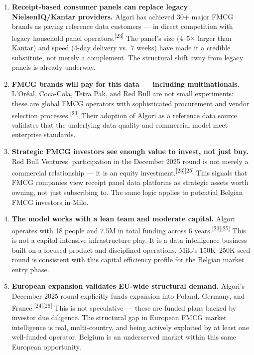 \documentclass[11pt,a4paper]{article}
\begin{document}
\begin{enumerate}[leftmargin=1.5em, itemsep=6pt]

  \item \textbf{Receipt-based consumer panels can replace legacy NielsenIQ/Kantar providers.}
  Algori has achieved 30+ major FMCG brands as paying reference data customers --- in direct competition with legacy household panel operators.\textsuperscript{[23]} The panel's size (4--5$\times$ larger than Kantar) and speed (4-day delivery vs.\ 7 weeks) have made it a credible substitute, not merely a complement. The structural shift away from legacy panels is already underway.

  \item \textbf{FMCG brands will pay for this data --- including multinationals.}
  L'Or\'{e}al, Coca-Cola, Tetra Pak, and Red Bull are not small experiments: these are global FMCG operators with sophisticated procurement and vendor selection processes.\textsuperscript{[23]} Their adoption of Algori as a reference data source validates that the underlying data quality and commercial model meet enterprise standards.

  \item \textbf{Strategic FMCG investors see enough value to invest, not just buy.}
  Red Bull Ventures' participation in the December 2025 round is not merely a commercial relationship --- it is an equity investment.\textsuperscript{[23][25]} This signals that FMCG companies view receipt panel data platforms as strategic assets worth owning, not just subscribing to. The same logic applies to potential Belgian FMCG investors in Milo.

  \item \textbf{The model works with a lean team and moderate capital.}
  Algori operates with 18 people and \texteuro{}7.5M in total funding across 6 years.\textsuperscript{[23][25]} This is not a capital-intensive infrastructure play. It is a data intelligence business built on a focused product and disciplined operations. Milo's \texteuro{}150K--250K seed round is consistent with this capital efficiency profile for the Belgian market entry phase.

  \item \textbf{European expansion validates EU-wide structural demand.}
  Algori's December 2025 round explicitly funds expansion into Poland, Germany, and France.\textsuperscript{[24][26]} This is not speculative --- these are funded plans backed by investor due diligence. The structural gap in European FMCG market intelligence is real, multi-country, and being actively exploited by at least one well-funded operator. Belgium is an underserved market within this same European opportunity.


\end{enumerate}
\end{document}
